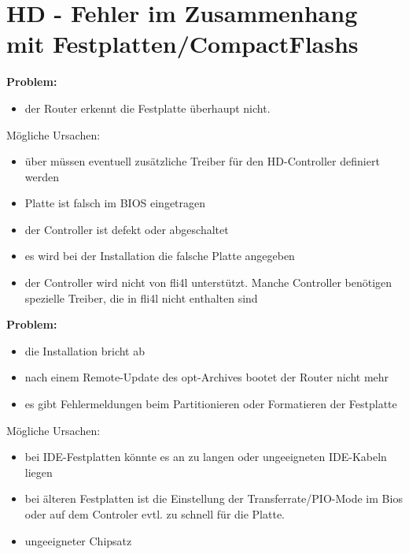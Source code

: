 {
  \section{HD - Fehler im Zusammenhang mit Festplatten/CompactFlashs}
}    
    \textbf{Problem:}

    \begin{itemize}
    \item der Router erkennt die Festplatte überhaupt nicht.
    \end{itemize}

    Mögliche Ursachen:

    \begin{itemize}
    \item über  müssen eventuell zusätzliche Treiber 
      für den HD-Controller definiert werden
    \item Platte ist falsch im BIOS eingetragen
    \item der Controller ist defekt oder abgeschaltet
    \item es wird bei der Installation die falsche Platte angegeben
    \item der Controller wird nicht von fli4l unterstützt. Manche
      Controller benötigen spezielle Treiber, die in fli4l 
      nicht enthalten sind
    \end{itemize}

    \textbf{Problem:}
    \begin{itemize}
    \item die Installation bricht ab
    \item nach einem Remote-Update des opt-Archives bootet der Router nicht
      mehr
    \item es gibt Fehlermeldungen beim Partitionieren oder Formatieren
      der Festplatte
    \end{itemize}

    Mögliche Ursachen:
    \begin{itemize}
    \item bei IDE-Festplatten könnte es an zu langen oder
      ungeeigneten IDE-Kabeln liegen
    \item bei älteren Festplatten ist die Einstellung der
      Transferrate/PIO-Mode im Bios oder auf dem Controler evtl. zu
      schnell für die Platte.
    \item ungeeigneter Chipsatz
    \end{itemize}

